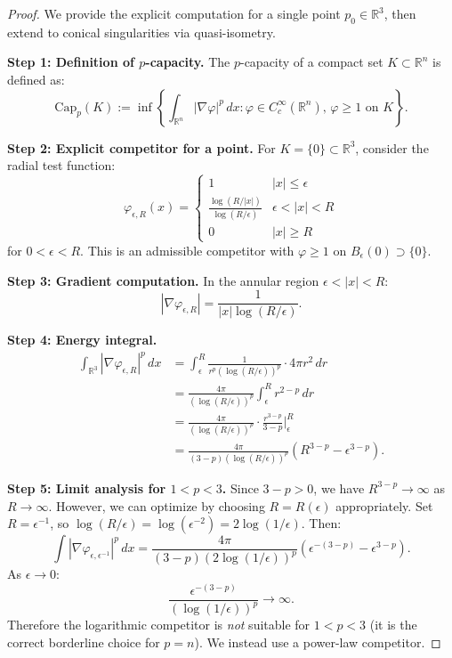 \begin{proof}
We provide the explicit computation for a single point $p_0 \in \mathbb{R}^3$, then extend to conical singularities via quasi-isometry.

\textbf{Step 1: Definition of $p$-capacity.}
The $p$-capacity of a compact set $K \subset \mathbb{R}^n$ is defined as:
\begin{equation}
    \text{Cap}_p(K) := \inf \left\{ \int_{\mathbb{R}^n} |\nabla \varphi|^p \, dx : \varphi \in C^\infty_c(\mathbb{R}^n), \, \varphi \ge 1 \text{ on } K \right\}.
\end{equation}

\textbf{Step 2: Explicit competitor for a point.}
For $K = \{0\} \subset \mathbb{R}^3$, consider the radial test function:
\begin{equation}
    \varphi_{\epsilon,R}(x) = \begin{cases}
        1 & |x| \le \epsilon \\
        \displaystyle\frac{\log(R/|x|)}{\log(R/\epsilon)} & \epsilon < |x| < R \\
        0 & |x| \ge R
    \end{cases}
\end{equation}
for $0 < \epsilon < R$. This is an admissible competitor with $\varphi \ge 1$ on $B_\epsilon(0) \supset \{0\}$.

\textbf{Step 3: Gradient computation.}
In the annular region $\epsilon < |x| < R$:
\begin{equation}
    |\nabla \varphi_{\epsilon,R}| = \frac{1}{|x| \log(R/\epsilon)}.
\end{equation}

\textbf{Step 4: Energy integral.}
\begin{align}
    \int_{\mathbb{R}^3} |\nabla \varphi_{\epsilon,R}|^p \, dx &= \int_\epsilon^R \frac{1}{r^p (\log(R/\epsilon))^p} \cdot 4\pi r^2 \, dr \\
    &= \frac{4\pi}{(\log(R/\epsilon))^p} \int_\epsilon^R r^{2-p} \, dr \\
    &= \frac{4\pi}{(\log(R/\epsilon))^p} \cdot \frac{r^{3-p}}{3-p} \Big|_\epsilon^R \\
    &= \frac{4\pi}{(3-p)(\log(R/\epsilon))^p} \left( R^{3-p} - \epsilon^{3-p} \right).
\end{align}

\textbf{Step 5: Limit analysis for $1 < p < 3$.}
Since $3 - p > 0$, we have $R^{3-p} \to \infty$ as $R \to \infty$. However, we can optimize by choosing $R = R(\epsilon)$ appropriately. Set $R = \epsilon^{-1}$, so $\log(R/\epsilon) = \log(\epsilon^{-2}) = 2\log(1/\epsilon)$. Then:
\begin{equation}
    \int |\nabla \varphi_{\epsilon,\epsilon^{-1}}|^p \, dx = \frac{4\pi}{(3-p)(2\log(1/\epsilon))^p} \left( \epsilon^{-(3-p)} - \epsilon^{3-p} \right).
\end{equation}
As $\epsilon \to 0$:
\begin{equation}
    \frac{\epsilon^{-(3-p)}}{(\log(1/\epsilon))^p} \to \infty.
\end{equation}
Therefore the logarithmic competitor is \emph{not} suitable for $1<p<3$ (it is the correct borderline choice for $p=n$). We instead use a power-law competitor.


\end{proof}
